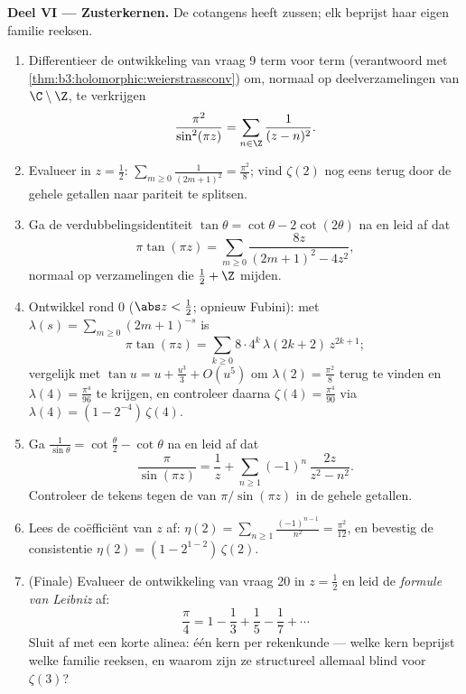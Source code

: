 \begin{problem}
\medskip
\noindent\textbf{Deel VI --- Zusterkernen.} De cotangens heeft
zussen; elk beprijst haar eigen familie reeksen.
\begin{enumerate}[resume]
  \item Differentieer de ontwikkeling van vraag 9 term voor term
        (verantwoord met \cref{thm:b3:holomorphic:weierstrassconv})
        om, normaal op  deelverzamelingen van
        $\C\setminus\Z$, te verkrijgen
        \[
        \frac{\pi^2}{\sin^2(\pi z)} =
        \sum_{n\in\Z}\frac1{(z - n)^2} .
        \]
  \item Evalueer in $z = \frac12$:
        $\sum_{m\geq0}\frac1{(2m+1)^2} = \frac{\pi^2}8$; vind
        $\zeta(2)$ nog eens terug door de gehele getallen naar
        pariteit te splitsen.
  \item Ga de verdubbelingsidentiteit $\tan\theta = \cot\theta -
        2\cot(2\theta)$ na en leid af dat
        \[
        \pi\tan(\pi z) =
        \sum_{m\geq0}\frac{8z}{(2m+1)^2 - 4z^2} ,
        \]
        normaal op  verzamelingen die $\frac12 + \Z$
        mijden.
  \item Ontwikkel rond $0$ ($\abs z < \frac12$; opnieuw Fubini):
        met $\lambda(s) = \sum_{m\geq0}(2m+1)^{-s}$ is
        \[
        \pi\tan(\pi z) =
        \sum_{k\geq0}8\cdot4^k\,\lambda(2k+2)\,z^{2k+1} ;
        \]
        vergelijk met $\tan u = u + \frac{u^3}3 + O(u^5)$ om
        $\lambda(2) = \frac{\pi^2}8$ terug te vinden en
        $\lambda(4) = \frac{\pi^4}{96}$ te krijgen, en controleer
        daarna $\zeta(4) = \frac{\pi^4}{90}$ via $\lambda(4) = (1
        - 2^{-4})\,\zeta(4)$.
  \item Ga $\frac1{\sin\theta} = \cot\frac\theta2 - \cot\theta$
        na en leid af dat
        \[
        \frac{\pi}{\sin(\pi z)} = \frac1z +
        \sum_{n\geq1}(-1)^n\,\frac{2z}{z^2 - n^2} .
        \]
        Controleer de tekens tegen de  van $\pi/\sin(\pi
        z)$ in de gehele getallen.
  \item Lees de coëfficiënt van $z$ af: $\eta(2) =
        \sum_{n\geq1}\frac{(-1)^{n-1}}{n^2} = \frac{\pi^2}{12}$,
        en bevestig de consistentie $\eta(2) = (1 -
        2^{1-2})\,\zeta(2)$.
  \item (Finale) Evalueer de ontwikkeling van vraag 20 in $z =
        \frac12$ en leid de \emph{formule van Leibniz} af:
        \[
        \frac\pi4 = 1 - \frac13 + \frac15 - \frac17 +
        \cdots
        \]
        Sluit af met een korte alinea: één kern per rekenkunde
        --- welke kern beprijst welke familie reeksen, en waarom
        zijn ze structureel allemaal blind voor $\zeta(3)$?


\end{enumerate}
\end{problem}
